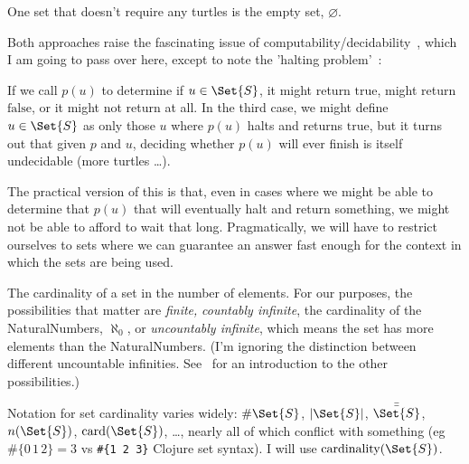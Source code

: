 One set that doesn't require any turtles is 
the empty set, $\varnothing$.


Both approaches raise the fascinating issue of 
computability/decidability~\cite{church1936unsolvable,
turing1936computability,
turing1938computable-correction,
turing1937computability-lambda},
which I am going to pass over here, except to note the 
'halting problem'~\cite{wiki:Halting-problem}:

If we call $p(u)$ to determine if $u \in \Set{S}$, 
it might return $\text{true}$, might return $\text{false}$,
or it might not return at all.
In the third case, we might define $u \in \Set{S}$ as only those
$u$ where $p(u)$ halts and returns $\text{true}$, but it turns 
out that given $p$ and $u$, deciding whether $p(u)$ will ever
finish is itself undecidable (more turtles \ldots).

The practical version of this is that, even in cases where we
might be able to determine that $p(u)$ that will eventually halt
and return something, we might not be able to afford to wait that
long.
Pragmatically, we will have to restrict ourselves to sets where we
can guarantee an answer fast enough for the context in which the
sets are being used.


The cardinality of a set in the number of elements.
For our purposes, the possibilities that matter are \emph{finite,}
\emph{countably infinite}, the cardinality of the
\gls{NaturalNumbers}, $\aleph_{0}$, or \emph{uncountably
infinite}, which means the set has more elements than the
\gls{NaturalNumbers}.
(I'm ignoring the distinction between different uncountable
infinities.
See~\cite{wiki:cardinal-number} for an introduction to the other
possibilities.)

Notation for set cardinality varies widely:
$\#\Set{S}$,  $|\Set{S}|$,
$\bar{\bar{\Set{S}}}$, $n(\Set{S})$,
$\text{card}(\Set{S})$, \ldots, nearly all of which conflict
with something (eg $\#\{ 0 \, 1 \, 2 \} = 3$ vs 
\lstinline|#{1 2 3}| Clojure set syntax).
I will use $\text{cardinality}(\Set{S})$.


